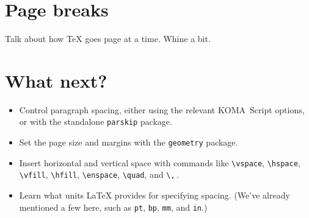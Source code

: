 \section{Page breaks}

Talk about how \TeX{} goes page at a time.
Whine a bit.

\section{What next?}
\begin{itemize}
\item Control paragraph spacing, either using the relevant
KOMA~Script options, or with the standalone \texttt{parskip} package.
\item Set the page size and margins with the \texttt{geometry} package.
\item Insert horizontal and vertical space with commands like
    \verb|\vspace|, \verb|\hspace|, \verb|\vfill|, \verb|\hfill|,
    \verb|\enspace|, \verb|\quad|, and \verb|\,|\,.
\item Learn what units \LaTeX{} provides for specifying spacing.
    (We've already mentioned a few here, such as
    \texttt{pt}, \texttt{bp}, \texttt{mm}, and \texttt{in}.)
\end{itemize}
